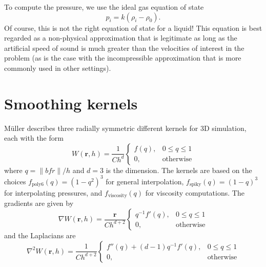 \documentclass[10pt, leqno]{article} %
\newcommand{\bfr}{\mathbf{r}}
\newcommand{\fWps}{f_{\mathrm{poly6}}}
\newcommand{\fWsp}{f_{\mathrm{spiky}}}
\newcommand{\fWvi}{f_{\mathrm{viscosity}}}
\begin{document}
To compute the pressure, we use the ideal gas equation of state
\begin{equation} \label{eq-eos}
  p_i = k (\rho_i-\rho_0).
\end{equation}
Of course, this is not the right equation of state for a liquid!
This equation is best regarded as a non-physical approximation that
is legitimate as long as the artificial speed of sound is much greater
than the velocities of interest in the problem (as is the case
with the incompressible approximation that is more commonly used in other
settings).

\section{Smoothing kernels}

M\"uller describes three radially symmetric different kernels for 3D
simulation, each with the form
\[
  W(\bfr, h) = \frac{1}{Ch^d}
  \begin{cases}
    f(q), & 0 \leq q \leq 1 \\
    0,    & \mbox{otherwise}
  \end{cases}
\]
where $q = \|bfr\|/h$ and $d = 3$ is the dimension.  The kernels are
based on the choices $\fWps(q) = (1-q^2)^3$ for general interpolation,
$\fWsp(q) = (1-q)^3$ for interpolating pressures, and $\fWvi(q)$ for
viscosity computations.  The gradients are given by
\[
  \nabla W(\bfr, h) = \frac{\bfr}{Ch^{d+2}}
  \begin{cases}
    q^{-1} f'(q), & 0 \leq q \leq 1 \\
    0,           & \mbox{otherwise}
  \end{cases}
\]
and the Laplacians are
\[
  \nabla^2 W(\bfr, h) = \frac{1}{Ch^{d+2}}
  \begin{cases}
    f''(q) + (d-1) q^{-1} f'(q), & 0 \leq q \leq 1 \\
    0,                          & \mbox{otherwise}
  \end{cases}
\]
\end{document}
